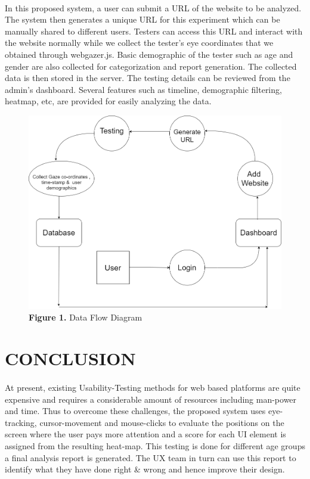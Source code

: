 \documentclass[a4paper,12pt,oneside]{article}
\begin{document}
\paragraph{}
In this proposed system, a user can submit a URL of the website to be analyzed. The system then generates a unique URL for this experiment which can be manually shared to different users.
Testers can access this URL and interact with the website normally while we collect the tester's eye coordinates that we obtained through webgazer.js. Basic demographic of the tester such as age and gender are also collected for categorization and report generation. The collected data is then stored in the server. 
The testing details can be reviewed from the admin's dashboard. Several features such as timeline, demographic filtering, heatmap, etc, are provided for easily analyzing the data.
\begin{figure}[H]
    \centering
    \includegraphics[width=\linewidth]{DFD.png}
    \caption{\textbf{Figure 1.} Data Flow Diagram}
    \label{fig:dfd}
    \label{}
\end{figure}

\newpage
\section{CONCLUSION}
\paragraph{}
\noindent
At present, existing Usability-Testing methods for web based platforms are quite expensive and requires a considerable amount of resources including man-power and time. Thus to overcome these challenges, the proposed system uses eye-tracking, cursor-movement and mouse-clicks to evaluate the positions on the screen where the user pays more attention and a score for each UI element is assigned from the resulting heat-map. This testing is done for different age groups a final analysis report is generated. The UX team in turn can use this report to identify what they have done right & wrong and hence improve their design.
\end{document}

